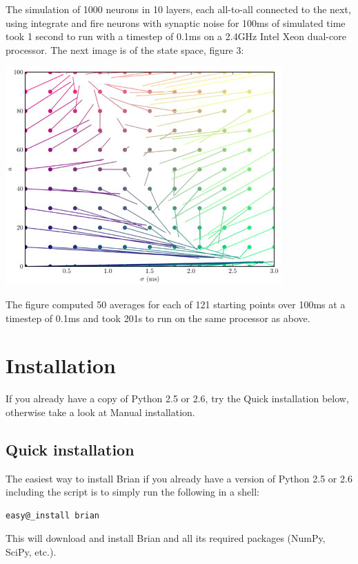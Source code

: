 \documentclass[letterpaper,10pt,english]{manual}
\begin{document}
The simulation of 1000 neurons in 10 layers, each all-to-all connected to the next, using integrate and fire
neurons with synaptic noise for 100ms of simulated time took 1 second to run with a timestep of 0.1ms on a
2.4GHz Intel Xeon dual-core processor. The next image is of the state space, figure 3:

\includegraphics{sfc-statespace.jpg}

The figure computed 50 averages for each of 121 starting points over 100ms at a timestep of 0.1ms and took
201s to run on the same processor as above.

\resetcurrentobjects
\hypertarget{--doc-installation}{}

\chapter{Installation}

If you already have a copy of Python 2.5 or 2.6, try the Quick installation below,
otherwise take a look at Manual installation.


\section{Quick installation}

The easiest way to install Brian if you already have a version of Python 2.5 or 2.6 including the
 script is to simply run the following in a shell:

\begin{Verbatim}[commandchars=@\[\]]
easy@_install brian
\end{Verbatim}

This will download and install Brian and all its required packages (NumPy, SciPy, etc.).
\end{document}

